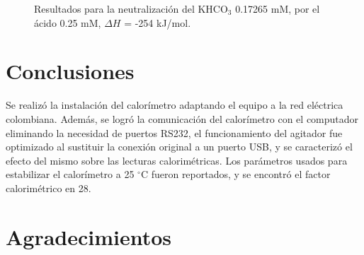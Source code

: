 \documentclass[a0]{sciposter}
\newcommand{\grad}{$^\circ$C}
\begin{document}
\begin{multicols}{3}
\begin{figure}[h]
		\caption{Resultados para la neutralización del KHCO$_3$ 0.17265 mM, por el ácido 0.25 mM, $\Delta H$ = -254 kJ/mol.}
	\end{figure}
	
\section{Conclusiones}
	Se realiz\'o la instalaci\'on del calorímetro adaptando el equipo a la red eléctrica colombiana. Además, se logró la comunicaci\'on del calor\'imetro con el computador eliminando la necesidad de puertos RS232, el funcionamiento del agitador fue optimizado al sustituir la conexión original a un puerto USB, y se caracteriz\'o el efecto del mismo sobre las lecturas calorim\'etricas. Los parámetros usados para estabilizar el calorímetro a 25 \grad{} fueron reportados, y se encontró el factor calorimétrico en 28.

\printbibliography[heading=bibintoc, title={Referencias}]
\section*{Agradecimientos}

\end{multicols}
\end{document}
